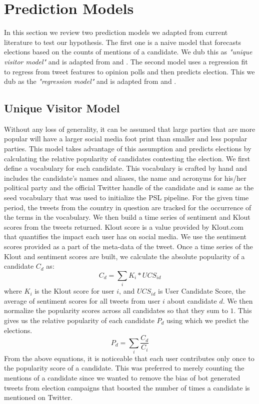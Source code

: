 \chapter{Prediction Models}
In this section we review two prediction models we adapted from current literature to test our hypothesis. 
The first one is a naive model that forecasts elections based on the counts of mentions of a candidate.
We dub this as  \emph{"unique visitor model"} and is adapted from \cite{saez2011total} and \cite{tumasjan2010predicting}.
The second model uses a regression fit to regress from tweet features to opinion polls and then predicts election. 
This we dub as the \emph{"regression model"} and is adapted from \cite{bermingham2011using} and \cite{o2010tweets}.
\section{Unique Visitor Model}
Without any loss of generality, it can be assumed that large parties that are more popular will have a larger social media foot print than smaller and less popular parties. 
This model takes advantage of this assumption and predicts elections by calculating the relative popularity of candidates contesting the election.
We first define a vocabulary for each candidate. 
This vocabulary is crafted by hand and includes the candidate's names and aliases, the name and acronyms for his/her political party and the official Twitter handle of the candidate and is same as the seed vocabulary that was used to initialize the PSL pipeline.
For the given time period, the tweets from the country in question are tracked for the occurrence of the terms in the vocabulary.
We then build a time series of sentiment and Klout scores from the tweets returned.
Klout score is a value provided by Klout.com that quantifies the impact each user has on social media. 
We use the sentiment scores provided as a part of the meta-data of the tweet. 
Once a time series of the Klout and sentiment scores are built, we calculate the absolute popularity of a candidate $C_d$ as:
\begin{equation}
{C_d} = \sum_i K_i * UCS_{id}
\end{equation}
where $K_i$ is the Klout score for user $i$, and $UCS_{id}$ is User Candidate Score, the average of sentiment scores for all tweets from user $i$ about candidate $d$.
We then normalize the popularity scores across all candidates so that they sum to $1$.
This gives us the relative popularity of each candidate $P_d$ using which we predict the elections.
\begin{equation}
{P_d} = \sum_i \frac{C_d}{C_i}
\end{equation}
From the above equations, it is noticeable that each user contributes only once to the popularity score of a candidate.
This was preferred to merely counting the mentions of a candidate since we wanted to remove the bias of bot generated tweets from election campaigns that boosted the number of times a candidate is mentioned on Twitter.
